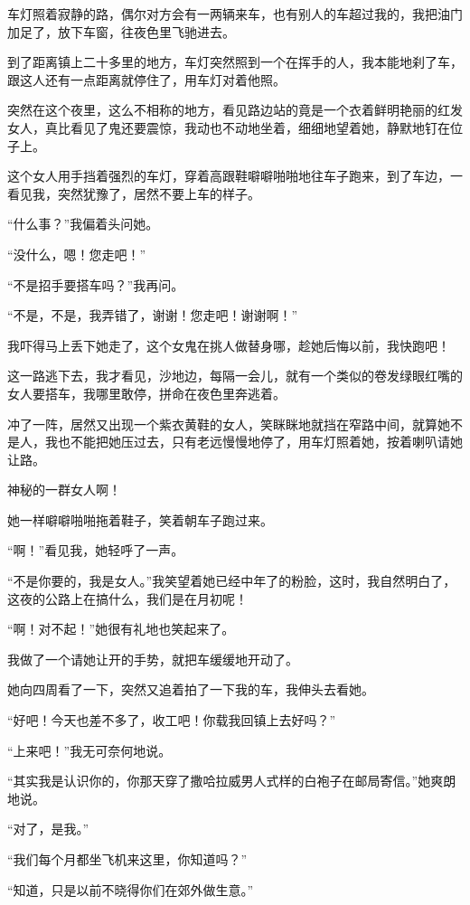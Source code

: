 \par 车灯照着寂静的路，偶尔对方会有一两辆来车，也有别人的车超过我的，我把油门加足了，放下车窗，往夜色里飞驰进去。
\par 到了距离镇上二十多里的地方，车灯突然照到一个在挥手的人，我本能地刹了车，跟这人还有一点距离就停住了，用车灯对着他照。
\par 突然在这个夜里，这么不相称的地方，看见路边站的竟是一个衣着鲜明艳丽的红发女人，真比看见了鬼还要震惊，我动也不动地坐着，细细地望着她，静默地钉在位子上。
\par 这个女人用手挡着强烈的车灯，穿着高跟鞋噼噼啪啪地往车子跑来，到了车边，一看见我，突然犹豫了，居然不要上车的样子。
\par “什么事？”我偏着头问她。
\par “没什么，嗯！您走吧！”
\par “不是招手要搭车吗？”我再问。
\par “不是，不是，我弄错了，谢谢！您走吧！谢谢啊！”
\par 我吓得马上丢下她走了，这个女鬼在挑人做替身哪，趁她后悔以前，我快跑吧！
\par 这一路逃下去，我才看见，沙地边，每隔一会儿，就有一个类似的卷发绿眼红嘴的女人要搭车，我哪里敢停，拼命在夜色里奔逃着。
\par 冲了一阵，居然又出现一个紫衣黄鞋的女人，笑眯眯地就挡在窄路中间，就算她不是人，我也不能把她压过去，只有老远慢慢地停了，用车灯照着她，按着喇叭请她让路。
\par 神秘的一群女人啊！
\par 她一样噼噼啪啪拖着鞋子，笑着朝车子跑过来。
\par “啊！”看见我，她轻呼了一声。
\par “不是你要的，我是女人。”我笑望着她已经中年了的粉脸，这时，我自然明白了，这夜的公路上在搞什么，我们是在月初呢！
\par “啊！对不起！”她很有礼地也笑起来了。
\par 我做了一个请她让开的手势，就把车缓缓地开动了。
\par 她向四周看了一下，突然又追着拍了一下我的车，我伸头去看她。
\par “好吧！今天也差不多了，收工吧！你载我回镇上去好吗？”
\par “上来吧！”我无可奈何地说。
\par “其实我是认识你的，你那天穿了撒哈拉威男人式样的白袍子在邮局寄信。”她爽朗地说。
\par “对了，是我。”
\par “我们每个月都坐飞机来这里，你知道吗？”
\par “知道，只是以前不晓得你们在郊外做生意。”
